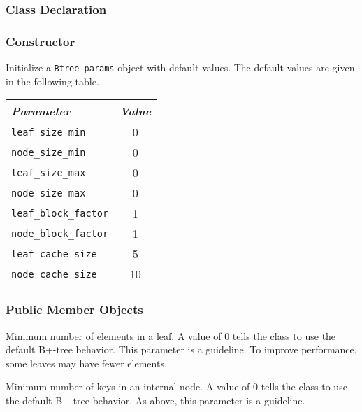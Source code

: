 \subsubsection{Class Declaration}

\btabb

   {}

\etabb

\subsubsection{Constructor}

\btabb

   {Initialize a \lstinline|Btree_params| object with
  default values. The default values are given in the following table.\\[1mm]
  \begin{tabular}{|l|c|}
    \hline
    {\em Parameter} & {\em Value} \\ \hline
    \lstinline|leaf_size_min| & 0 \\ \hline
    \lstinline|node_size_min| & 0 \\ \hline
    \lstinline|leaf_size_max| & 0 \\ \hline
    \lstinline|node_size_max| & 0 \\ \hline
    \lstinline|leaf_block_factor| & 1 \\ \hline
    \lstinline|node_block_factor| & 1 \\ \hline
    \lstinline|leaf_cache_size| & 5 \\ \hline
    \lstinline|node_cache_size| & 10 \\ \hline
  \end{tabular}
  }

\etabb

\subsubsection{Public Member Objects}

\btabb

   {Minimum number of elements in a leaf. A
  value of $0$ tells the class to use the default B+-tree behavior. This
  parameter is a guideline. To improve performance, some leaves may have
  fewer elements.}

   {Minimum number of keys in an internal
  node. A value of $0$ tells the class to use the default B+-tree
  behavior. As above, this parameter is a guideline.}


